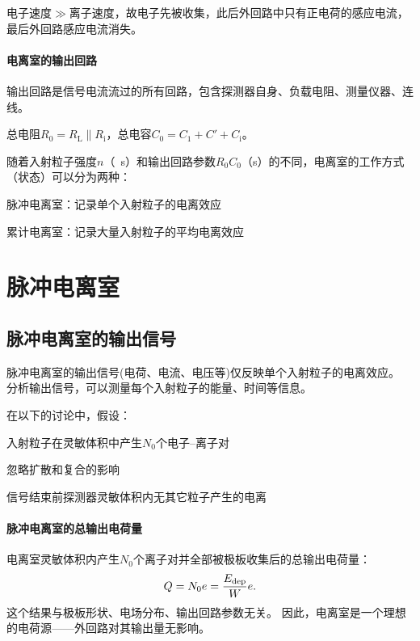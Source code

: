 电子速度$\gg$离子速度，故电子先被收集，此后外回路中只有正电荷的感应电流，最后外回路感应电流消失。
\paragraph{电离室的输出回路}
输出回路是信号电流流过的所有回路，包含探测器自身、负载电阻、测量仪器、连线。
\begin{notecaptionblock}
\end{notecaptionblock}
总电阻$R_0 = R_{\mathrm{L}} \parallel R_{\mathrm{i}}$，总电容$C_0 = C_1 + C' + C_{\mathrm{i}}$。

随着入射粒子强度$n$（\unit{\per\second}）和输出回路参数$R_0C_0$（\unit{\second}）的不同，电离室的工作方式（状态）可以分为两种：
\begin{compactitem}
	\item 脉冲电离室：记录单个入射粒子的电离效应
	\item 累计电离室：记录大量入射粒子的平均电离效应
\end{compactitem}

\section{脉冲电离室}

\subsection{脉冲电离室的输出信号}

脉冲电离室的输出信号(电荷、电流、电压等)仅反映单个入射粒子的电离效应。
分析输出信号，可以测量每个入射粒子的能量、时间等信息。

在以下的讨论中，假设：
\begin{compactenum}
	\item 入射粒子在灵敏体积中产生$N_0$个电子--离子对
	\item 忽略扩散和复合的影响
	\item 信号结束前探测器灵敏体积内无其它粒子产生的电离
\end{compactenum}
\paragraph{脉冲电离室的总输出电荷量}
电离室灵敏体积内产生$N_0$个离子对并全部被极板收集后的总输出电荷量：
\begin{equation}\label{eq:nrd-collected-ionization-charge}
	Q = N_0e = \frac{E_{\mathrm{dep}}}We.
\end{equation}
这个结果与极板形状、电场分布、输出回路参数无关。
因此，电离室是一个理想的电荷源——外回路对其输出量无影响。
